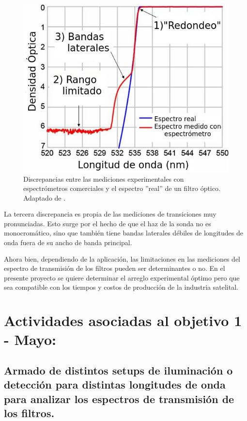 \documentclass{ctuthesis}
\begin{document}
\begin{figure}[h!]
	\centering
	\includegraphics[scale=0.8]{Figs/plan_de_tesis/measurement_of_optical_filter.jpg}
	\caption{Discrepancias entre las mediciones experimentales con 
		espectrómetros 
		comerciales y el espectro ''real'' de un filtro óptico. Adaptado de 
		\cite{Semrock}.}
	\label{fig:obj1a}
\end{figure}

La tercera 
discrepancia es propia de las mediciones de transiciones muy 
pronunciadas. Esto surge 
por el hecho de que el 
haz de la sonda no es monocromático, sino que también tiene bandas 
laterales débiles de longitudes de onda fuera de su ancho de banda 
principal.




Ahora bien, dependiendo de la aplicación, las limitaciones en las mediciones 
del espectro de transmisión de los filtros pueden ser determinantes o no. En el 
presente proyecto se quiere determinar el arreglo experimental óptimo pero que 
sea compatible con los tiempos y costos de producción de la industria satelital.

\section*{Actividades asociadas al objetivo 1 - Mayo:}
\subsection*{ Armado de distintos setups de iluminación o detección para 
distintas longitudes de onda para analizar los espectros de transmisión de los 
filtros.}
\end{document}
